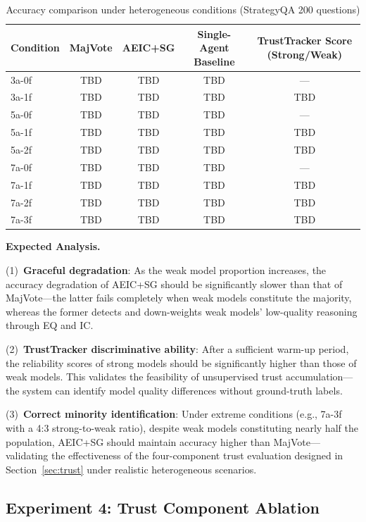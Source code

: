 \documentclass[12pt,a4paper]{article}
\begin{document}
\begin{table}[H]
\centering
\caption{Accuracy comparison under heterogeneous conditions (StrategyQA 200 questions)}\label{tab:exp3_result}
\begin{tabular}{lcccc}
\toprule
Condition & MajVote & AEIC+SG & Single-Agent Baseline & TrustTracker Score (Strong/Weak) \\
\midrule
3a-0f & TBD & TBD & TBD & --- \\
3a-1f & TBD & TBD & TBD & TBD \\
5a-0f & TBD & TBD & TBD & --- \\
5a-1f & TBD & TBD & TBD & TBD \\
5a-2f & TBD & TBD & TBD & TBD \\
7a-0f & TBD & TBD & TBD & --- \\
7a-1f & TBD & TBD & TBD & TBD \\
7a-2f & TBD & TBD & TBD & TBD \\
7a-3f & TBD & TBD & TBD & TBD \\
\bottomrule
\end{tabular}
\end{table}

\textbf{Expected Analysis.}

(1)~\textbf{Graceful degradation}: As the weak model proportion increases, the accuracy degradation of AEIC+SG should be significantly slower than that of MajVote---the latter fails completely when weak models constitute the majority, whereas the former detects and down-weights weak models' low-quality reasoning through EQ and IC.

(2)~\textbf{TrustTracker discriminative ability}: After a sufficient warm-up period, the reliability scores of strong models should be significantly higher than those of weak models. This validates the feasibility of unsupervised trust accumulation---the system can identify model quality differences without ground-truth labels.

(3)~\textbf{Correct minority identification}: Under extreme conditions (e.g., 7a-3f with a 4:3 strong-to-weak ratio), despite weak models constituting nearly half the population, AEIC+SG should maintain accuracy higher than MajVote---validating the effectiveness of the four-component trust evaluation designed in Section~\ref{sec:trust} under realistic heterogeneous scenarios.

\subsection{Experiment 4: Trust Component Ablation}\label{sec:exp4}
\end{document}
